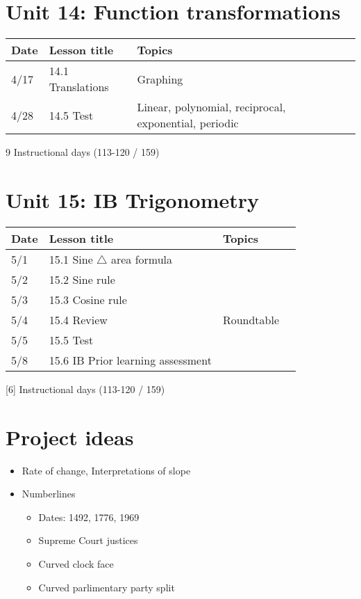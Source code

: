 \section*{Unit 14: Function transformations}
\begin{tabular}{|p{0.9cm}|p{4cm}|p{7cm}|p{5cm}|}
  \hline
  Date & Lesson title & Topics  &  \\
  \hline
  4/17 & 14.1 Translations & Graphing &  \\
  \hline
  4/28 & 14.5 Test & Linear, polynomial, reciprocal, exponential, periodic &  \\
  \hline


\end{tabular} \par \vspace*{0.3cm}
9 Instructional days (113-120 / 159)

\section*{Unit 15: IB Trigonometry}
\begin{tabular}{|p{0.9cm}|p{4cm}|p{7cm}|p{5cm}|}
  \hline
  Date & Lesson title & Topics  &  \\
  \hline
  5/1 & 15.1 Sine $\triangle$ area formula &  &  \\
  \hline
  5/2 & 15.2 Sine rule &  &  \\
  \hline
  5/3 & 15.3 Cosine rule &  &  \\
  \hline
  5/4 & 15.4 Review & Roundtable &  \\
  \hline
  5/5 & 15.5 Test &  &  \\
  \hline
  5/8 & 15.6 IB Prior learning assessment &  &  \\
  \hline

\end{tabular} \par \vspace*{0.3cm}
[6] Instructional days (113-120 / 159)

\newpage
\section*{Project ideas}
\begin{itemize}
  \item Rate of change, Interpretations of slope
  \item Numberlines
  \begin{itemize}
    \item Dates: 1492, 1776, 1969
    \item Supreme Court justices
    \item Curved clock face 
    \item Curved parlimentary party split
  \end{itemize}
\end{itemize}

